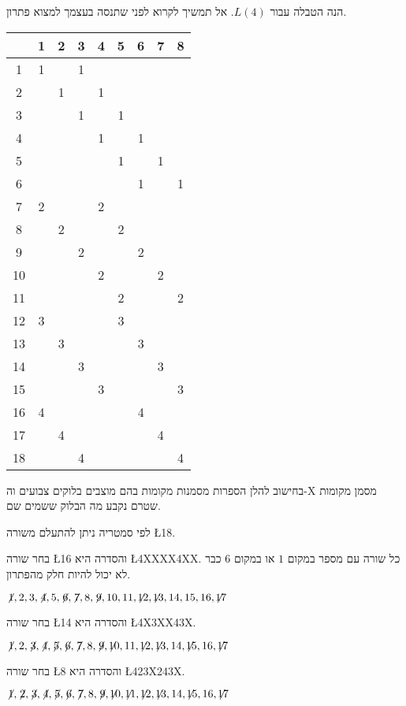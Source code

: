 הנה הטבלה עבור
$L(4)$.
אל תמשיך לקרוא לפני שתנסה בעצמך למצוא פתרון.
\begin{center}
\addtolength{\tabcolsep}{4pt}
\begin{tabular}{|c||c|c|c|c|c|c|c|c|}
\hline
&1&2&3&4&5&6&7&8\\\hline\hline
1&1&&1&&&&&\\\hline
2&&1&&1&&&&\\\hline
3&&&1&&1&&&\\\hline
4&&&&1&&1&&\\\hline
5&&&&&1&&1&\\\hline
6&&&&&&1&&1\\\hline
7&2&&&2&&&&\\\hline
8&&2&&&2&&&\\\hline
9&&&2&&&2&&\\\hline
10&&&&2&&&2&\\\hline
11&&&&&2&&&2\\\hline
12&3&&&&3&&&\\\hline
13&&3&&&&3&&\\\hline
14&&&3&&&&3&\\\hline
15&&&&3&&&&3\\\hline
16&4&&&&&4&&\\\hline
17&&4&&&&&4&\\\hline
18&&&4&&&&&4\\\hline
\end{tabular}
\end{center}
בחישוב להלן הספרות מסמנות מקומות בהם מוצבים בלוקים צבועים וה-X מסמן מקומות שטרם נקבע מה הבלוק ששמים שם.
 
לפי סמטריה ניתן להתעלם משורה
\L{18}.


\noindent 
בחר שורה
\L{16}
והסדרה היא
\L{4XXXX4XX}.
כל שורה עם מספר במקום
$1$
או במקום
$6$
כבר לא יכול להיות חלק מהפתרון.

$\not\! 1,2,3,\not\! 4,5,\not\! 6,\not\! 7,8,\not\! 9,10,11,\not\!\! 12,\not\!\! 13,14,15,16,\not\!\! 17$

\noindent
בחר שורה
\L{14}
והסדרה היא
\L{4X3XX43X}.

$\not\! 1,2,\not\! 3,\not\! 4,\not\! 5,\not\! 6,\not\! 7,8,\not\! 9,\not\!\! 10,11,\not\!\! 12,\not\!\! 13,14, \not\!\! 15,16,\not\!\! 17$

\noindent
בחר שורה
\L{8}
והסדרה היא
\L{423X243X}.

$\not\! 1,\not\! 2,\not\! 3,\not\! 4,\not\! 5,\not\! 6,\not\! 7,8,\not\! 9,\not\!\! 10,\not\!\! 11,\not\!\! 12,\not\!\! 13,14, \not\!\! 15,16,\not\!\! 17$

